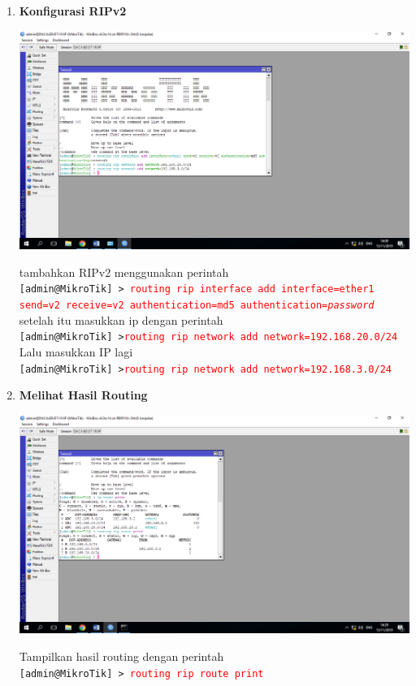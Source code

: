 \documentclass[a4paper,12pt]{article}
\begin{document}
\begin{enumerate}
	\item \textbf{Konfigurasi RIPv2\\}
	\begin{center}
		\includegraphics[scale=.38]{Page-6-Image-10}
	\end{center}
	tambahkan RIPv2 menggunakan perintah \\
	\texttt{[admin@MikroTik] > \textcolor{red}{routing rip interface add interface=ether1 send=v2 receive=v2 authentication=md5 authentication=\textit{password} }}\\
	setelah itu masukkan ip dengan perintah\\
	\texttt{[admin@MikroTik] >\textcolor{red}{routing rip network add network=192.168.20.0/24}}\\
	Lalu masukkan IP lagi\\
	\texttt{[admin@MikroTik] >\textcolor{red}{routing rip network add network=192.168.3.0/24}}
	
	\item \textbf{Melihat Hasil Routing}
	\begin{center}
		\includegraphics[scale=.4]{Page-6-Image-11}
	\end{center}
	Tampilkan hasil routing dengan perintah\\
	\texttt{[admin@MikroTik] > \textcolor{red}{routing rip route print}}
	

\end{enumerate}
\end{document}
